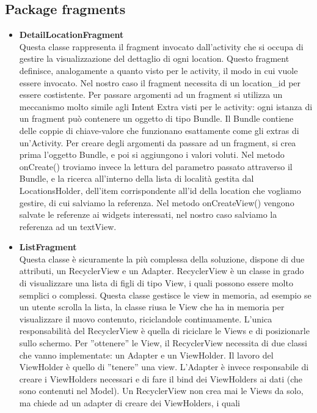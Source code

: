 \documentclass{article}
\begin{document}
\subsection{Package fragments}
\begin{itemize} 
    \item \textbf{DetailLocationFragment} \\
    Questa classe rappresenta il fragment invocato dall'activity che si occupa di gestire la visualizzazione del dettaglio
    di ogni location. Questo fragment definisce, analogamente a quanto visto per le activity, il modo in cui vuole essere invocato.
    Nel nostro caso il fragment necessita di un location\_id per essere costistente. Per passare argomenti ad un fragment si utilizza
    un meccanismo molto simile agli Intent Extra visti per le activity: ogni istanza di un fragment può contenere un oggetto di tipo Bundle. Il Bundle contiene delle coppie
    di chiave-valore che funzionano esattamente come gli extras di un’Activity. Per creare degli argomenti da
    passare ad un fragment, si crea prima l’oggetto Bundle, e poi si aggiungono i valori voluti.
    Nel metodo onCreate() troviamo invece la lettura del parametro passato attraverso il Bundle, e la ricerca all'interno della lista di località
    gestita dal LocationsHolder, dell'item corrispondente all'id della location che vogliamo gestire, di cui salviamo la referenza.  
    Nel metodo onCreateView() vengono salvate le referenze ai widgets interessati, nel nostro caso salviamo la referenza ad un textView.
    \item \textbf{ListFragment} \\
    Questa classe è sicuramente la più complessa della soluzione, dispone di due attributi, un RecyclerView e un Adapter.
    RecyclerView è un classe in grado di visualizzare una lista di figli di tipo View, i quali possono essere molto semplici o complessi.
    Questa classe gestisce le view in memoria, ad esempio se un utente scrolla la lista, la classe riusa le View che ha in memoria per visualizzare il nuovo contenuto,
    riciclandole continuamente.
    L’unica responsabilità del RecyclerView è quella di riciclare le Views e di posizionarle sullo schermo. Per 
    ”ottenere” le View, il RecyclerView necessita di due classi che vanno implementate: un Adapter e un ViewHolder.
    Il lavoro del ViewHolder è quello di ”tenere” una view. L’Adapter è invece responsabile
    di creare i ViewHolders necessari e di fare il bind dei ViewHolders ai dati (che sono contenuti nel Model).
    Un RecyclerView non crea mai le Views da solo, ma chiede ad un adapter di creare dei ViewHolders, i quali

\end{itemize}
\end{document}
